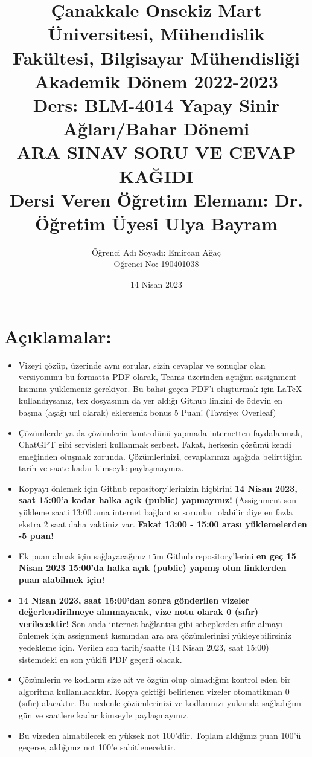 \documentclass[11pt]{article}
\title{Çanakkale Onsekiz Mart Üniversitesi, Mühendislik Fakültesi, Bilgisayar Mühendisliği Akademik Dönem 2022-2023\\
Ders: BLM-4014 Yapay Sinir Ağları/Bahar Dönemi\\ 
ARA SINAV SORU VE CEVAP KAĞIDI\\
Dersi Veren Öğretim Elemanı: Dr. Öğretim Üyesi Ulya Bayram}
\author{%
\begin{minipage}{\textwidth}
\raggedright
Öğrenci Adı Soyadı: Emircan Ağaç\\ %
Öğrenci No: 190401038
\end{minipage}%
}
\date{14 Nisan 2023}
\begin{document}
\maketitle

\vspace{-.5in}
\section*{Açıklamalar:}
\begin{itemize}
    \item Vizeyi çözüp, üzerinde aynı sorular, sizin cevaplar ve sonuçlar olan versiyonunu bu formatta PDF olarak, Teams üzerinden açtığım assignment kısmına yüklemeniz gerekiyor. Bu bahsi geçen PDF'i oluşturmak için LaTeX kullandıysanız, tex dosyasının da yer aldığı Github linkini de ödevin en başına (aşağı url olarak) eklerseniz bonus 5 Puan! (Tavsiye: Overleaf)
    \item Çözümlerde ya da çözümlerin kontrolünü yapmada internetten faydalanmak, ChatGPT gibi servisleri kullanmak serbest. Fakat, herkesin çözümü kendi emeğinden oluşmak zorunda. Çözümlerinizi, cevaplarınızı aşağıda belirttiğim tarih ve saate kadar kimseyle paylaşmayınız. 
    \item Kopyayı önlemek için Github repository'lerinizin hiçbirini \textbf{14 Nisan 2023, saat 15:00'a kadar halka açık (public) yapmayınız!} (Assignment son yükleme saati 13:00 ama internet bağlantısı sorunları olabilir diye en fazla ekstra 2 saat daha vaktiniz var. \textbf{Fakat 13:00 - 15:00 arası yüklemelerden -5 puan!}
    \item Ek puan almak için sağlayacağınız tüm Github repository'lerini \textbf{en geç 15 Nisan 2023 15:00'da halka açık (public) yapmış olun linklerden puan alabilmek için!}
    \item \textbf{14 Nisan 2023, saat 15:00'dan sonra gönderilen vizeler değerlendirilmeye alınmayacak, vize notu olarak 0 (sıfır) verilecektir!} Son anda internet bağlantısı gibi sebeplerden sıfır almayı önlemek için assignment kısmından ara ara çözümlerinizi yükleyebilirsiniz yedekleme için. Verilen son tarih/saatte (14 Nisan 2023, saat 15:00) sistemdeki en son yüklü PDF geçerli olacak.
    \item Çözümlerin ve kodların size ait ve özgün olup olmadığını kontrol eden bir algoritma kullanılacaktır. Kopya çektiği belirlenen vizeler otomatikman 0 (sıfır) alacaktır. Bu nedenle çözümlerinizi ve kodlarınızı yukarıda sağladığım gün ve saatlere kadar kimseyle paylaşmayınız.
    \item Bu vizeden alınabilecek en yüksek not 100'dür. Toplam aldığınız puan 100'ü geçerse, aldığınız not 100'e sabitlenecektir.

\end{itemize}
\end{document}
